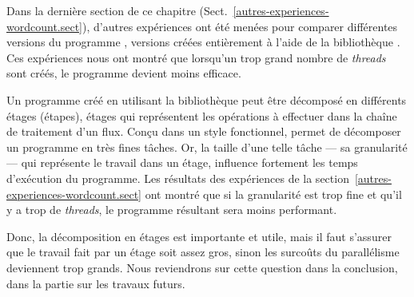 Dans la derni\`ere section de ce chapitre (Sect.~\ref{autres-experiences-wordcount.sect}), d'autres exp\'eriences ont \'et\'e men\'ees pour comparer diff\'erentes versions du programme , versions cr\'e\'ees enti\`erement \`a l'aide de la biblioth\`eque .
%
%
Ces expériences nous ont montré que lorsqu'un trop grand nombre de
\emph{threads} sont créés, le programme devient moins efficace.

Un programme cr\'e\'e en utilisant la biblioth\`eque  peut \^etre d\'ecompos\'e en diff\'erents \'etages (\'etapes), \'etages qui repr\'esentent les op\'erations à effectuer dans la cha\^ine de traitement d'un flux. Con\c{c}u dans un style fonctionnel,  permet de d\'ecomposer un programme en tr\`es fines t\^aches. Or, la taille d'une telle t\^ache --- sa granularit\'e --- qui repr\'esente le travail dans un \'etage, influence fortement les temps d'ex\'ecution du programme. Les r\'esultats des exp\'eriences de la section~\ref{autres-experiences-wordcount.sect} ont montr\'e que si la granularit\'e est trop fine et qu'il y a trop de \emph{threads}, le programme résultant sera moins performant. 

Donc, la d\'ecomposition en \'etages est importante et utile, mais il faut s'assurer que le travail fait par un \'etage soit assez gros, sinon les surco\^uts du parall\'elisme deviennent trop grands.
%
Nous reviendrons sur cette question dans la conclusion, dans la partie sur les travaux futurs.

